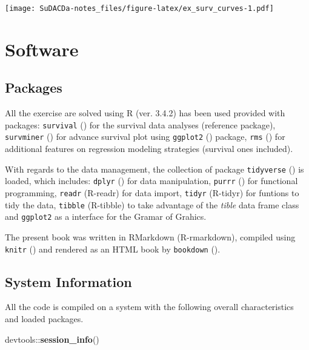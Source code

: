 \documentclass[]{book}
\newenvironment{Shaded}{\begin{snugshade}}{\end{snugshade}}
\newcommand{\KeywordTok}[1]{\textcolor[rgb]{0.13,0.29,0.53}{\textbf{{#1}}}}
\newcommand{\NormalTok}[1]{{#1}}
\theoremstyle{definition}
\theoremstyle{definition}
\theoremstyle{definition}
\theoremstyle{remark}
\begin{document}
\texttt{[image: SuDACDa-notes\_files/figure-latex/ex\_surv\_curves-1.pdf]}

\chapter*{Software}\label{software}

\section{Packages}\label{packages}

All the exercise are solved using R (ver. 3.4.2) has been used provided
with packages: \texttt{survival} (\citet{R-survival}) for the survival
data analyses (reference package), \texttt{survminer}
(\citet{R-survminer}) for advance survival plot using \texttt{ggplot2}
(\citet{R-ggplot2}) package, \texttt{rms} (\citet{R-rms}) for additional
features on regression modeling strategies (survival ones included).

With regards to the data management, the collection of package
\texttt{tidyverse} (\citet{R-tidyverse}) is loaded, which includes:
\texttt{dplyr} (\citet{R-dplyr}) for data manipulation, \texttt{purrr}
(\citet{R-purrr}) for functional programming, \texttt{readr} (R-readr)
for data import, \texttt{tidyr} (R-tidyr) for funtions to tidy the data,
\texttt{tibble} (R-tibble) to take advantage of the \emph{tible} data
frame class and \texttt{ggplot2} as a interface for the Gramar of
Grahics.

The present book was written in RMarkdown (R-rmarkdown), compiled using
\texttt{knitr} (\citet{R-knitr}) and rendered as an HTML book by
\texttt{bookdown} (\citet{R-bookdown}).

\section{System Information}\label{system-information}

All the code is compiled on a system with the following overall
characteristics and loaded packages.

\begin{Shaded}
\begin{Highlighting}[]
\NormalTok{devtools::}\KeywordTok{session_info}\NormalTok{()}
\end{Highlighting}
\end{Shaded}
\end{document}
